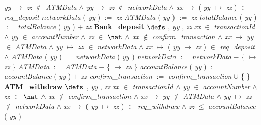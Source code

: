 \begin{tabbing}
{\em yy\/} $\mapsto$ {\em zz\/} $\not\in$ {\em ATMData\/} $\wedge$ \bnl
{\em yy\/} $\mapsto$ {\em zz\/} $\not\in$ {\em networkData\/} $\wedge$ \bnl
{\em xx\/} $\mapsto$  ( {\em yy\/} $\mapsto$ {\em zz\/} )  $\in$ {\em req\_deposit\/} \-\bnl
{} \+\bnl
{\em networkData\/} ( {\em yy\/} )  $:=$  {\em zz\/} \bparallel \bnl
{\em ATMData\/} ( {\em yy\/} )  $:=$  {\em zz\/} \bparallel \bnl
{\em totalBalance\/} ( {\em yy\/} )  $:=$  {\em totalBalance\/} ( {\em yy\/} )  $+$ {\em zz\/} \-\bnl
{}  \-\bnl
{}  \- \bOperationSemiColon \bbnl
%
%
{\bf { Bank\_deposit}}  \bhsp $\defs$ \+ \bnl
  \+\bnl
{}  , {\em yy\/} , {\em zz\/} \-\bnl
{} \+\bnl
{\em xx\/} $\in$ {\em transactionId\/} $\wedge$ \bnl
{\em yy\/} $\in$ {\em accountNumber\/} $\wedge$ \bnl
{\em zz\/} $\in$  $\nat$  $\wedge$ \bnl
{\em xx\/} $\not\in$ {\em confirm\_transaction\/} $\wedge$ \bnl
{\em xx\/} $\mapsto$ {\em yy\/} $\in$ {\em ATMData\/} $\wedge$ \bnl
{\em yy\/} $\mapsto$ {\em zz\/} $\in$ {\em networkData\/} $\wedge$ \bnl
{\em xx\/} $\mapsto$  ( {\em yy\/} $\mapsto$ {\em zz\/} )  $\in$ {\em req\_deposit\/} $\wedge$ \bnl
{\em ATMData\/} ( {\em yy\/} )  $=$ {\em networkData\/} ( {\em yy\/} )  \-\bnl
{} \+\bnl
{\em networkData\/} $:=$  {\em networkData\/} $-$  \{  $\mapsto$ {\em zz\/} \- \}  \bparallel \bnl
{\em ATMData\/} $:=$  {\em ATMData\/} $-$  \{  $\mapsto$ {\em zz\/} \- \}  \bparallel \bnl
{\em accountBalance\/} ( {\em yy\/} )  $:=$  {\em accountBalance\/} ( {\em yy\/} )  $+$ {\em zz\/} \bparallel \bnl
{\em confirm\_transaction\/} $:=$  {\em confirm\_transaction\/} $\cup$  \{  \- \}  \-\bnl
{}  \-\bnl
{}  \- \bOperationSemiColon \bbnl
%
%
{\bf { ATM\_withdraw}}  \bhsp $\defs$ \+ \bnl
  \+\bnl
{}  , {\em yy\/} , {\em zz\/} \-\bnl
{} \+\bnl
{\em xx\/} $\in$ {\em transactionId\/} $\wedge$ \bnl
{\em yy\/} $\in$ {\em accountNumber\/} $\wedge$ \bnl
{\em zz\/} $\in$  $\nat$  $\wedge$ \bnl
{\em xx\/} $\not\in$ {\em confirm\_transaction\/} $\wedge$ \bnl
{\em xx\/} $\mapsto$ {\em yy\/} $\not\in$ {\em ATMData\/} $\wedge$ \bnl
{\em yy\/} $\mapsto$ {\em zz\/} $\not\in$ {\em networkData\/} $\wedge$ \bnl
{\em xx\/} $\mapsto$  ( {\em yy\/} $\mapsto$ {\em zz\/} )  $\in$ {\em req\_withdraw\/} $\wedge$ \bnl
{\em zz\/} $\leq$ {\em accountBalance\/} ( {\em yy\/} )  \-\bnl

\end{tabbing}
